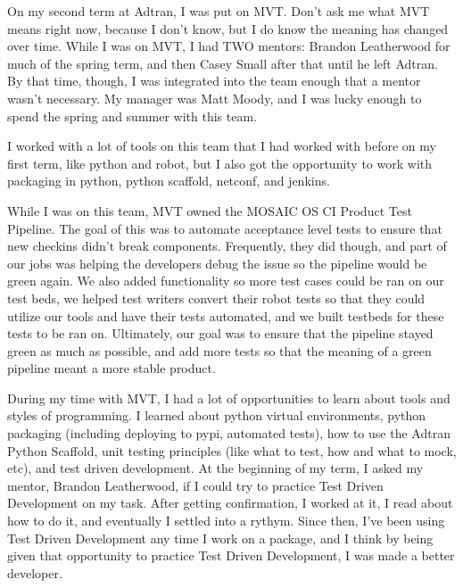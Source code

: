 \documentclass[12pt, letterpaper]{article}
\begin{document}
\par
On my second term at Adtran, I was put on MVT. Don't ask me what MVT means right now, because I
don't know, but I do know the meaning has changed over time. While I was on MVT, I had TWO mentors:
Brandon Leatherwood for much of the spring term, and then Casey Small after that until he left
Adtran. By that time, though, I was integrated into the team enough that a mentor wasn't necessary.
My manager was Matt Moody, and I was lucky enough to spend the spring and summer with this team.

\par
I worked with a lot of tools on this team that I had worked with before on my first term,
like python and robot, but I also got the opportunity to work with packaging in python, python scaffold, netconf, and jenkins.

\par
While I was on this team, MVT owned the MOSAIC OS CI Product Test Pipeline. The goal of this was to
automate acceptance level tests to ensure that new checkins didn't break components. Frequently,
they did though, and part of our jobs was helping the developers debug the issue so the pipeline
would be green again. We also added functionality so more test cases could be ran on our test beds,
we helped test writers convert their robot tests so that they could utilize our tools and have
their tests automated, and we built testbeds for these tests to be ran on. Ultimately, our goal was
to ensure that the pipeline stayed green as much as possible, and add more tests so that the
meaning of a green pipeline meant a more stable product.

\par
During my time with MVT, I had a lot of opportunities to learn about tools and styles of
programming. I learned about python virtual environments, python packaging (including deploying to
pypi, automated tests), how to use the Adtran Python Scaffold, unit testing principles (like what
to test, how and what to mock, etc), and test driven development. At the beginning of my term, I
asked my mentor, Brandon Leatherwood, if I could try to practice Test Driven Development on my
task. After getting confirmation, I worked at it, I read about how to do it, and eventually I
settled into a rythym. Since then, I've been using Test Driven Development any time I work on a
package, and I think by being given that opportunity to practice Test Driven Development, I was
made a better developer.
\end{document}
